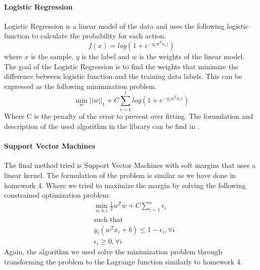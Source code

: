 \paragraph{Logistic Regression} 
Logistic Regression is a linear model of the data and uses the following logistic function to calculate the probability for each action.
\begin{equation}
f(x) = log(1 + e^{-y_iw^Tx_i)})
\end{equation}
where $x$ is the sample, $y$ is the label and $w$ is the weights of the linear model. The goal of the Logistic Regression is to find the weights that minimize the difference between logistic function and the training data labels. This can be expressed as the following minimization problem.
\begin{equation}
\min_w ||w||_1 + C\sum_{i=1}^l log(1 + e^{-y_iw^Tx_i)})
\end{equation}
Where C is the penalty of the error to prevent over fitting. The formulation and description of the used algorithm in the library can be find in \cite{Fan08}.

\paragraph{Support Vector Machines}
The final method tried is Support Vector Machines with soft margins \cite{cortes1995} that uses a linear kernel. The formulation of the problem is similar as we have done in homework 4. Where we tried to maximize the margin by solving the following constrained optimization problem: 
\begin{equation}
\begin{aligned}
& \min_{w,b,\epsilon} \frac{1}{2} w^Tw + C \sum_{i=1}^n \epsilon_i\\
& \text{such that}\\
& y_i(w^Tx_i + b) \leq 1 - \epsilon_i, \forall i\\
& \epsilon_i \geq 0, \forall i
\end{aligned}
\end{equation}
Again, the algorithm we used solve the minimization problem through transforming the problem to the Lagrange function similarly to homework 4. 